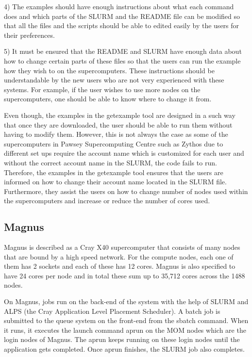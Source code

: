 \documentclass[journal]{IEEEtran}
\begin{document}
4) The examples should have enough instructions about what each command does and which parts of the SLURM and the README file can be modified so that
all the files and the scripts should be able to edited easily by the users for their preferences.

5) It must be ensured that the README and SLURM have enough data about how to change certain parts of these files so that the users can run the 
example how they wish to on the supercomputers. These instructions should be understandable by the new users who are not very experienced with these
systems. For example, if the user wishes to use more nodes on the supercomputers, one should be able to know where to change it from.
 
Even though, the examples in the getexample tool are designed in a such way that once they are downloaded, the user should be able to run them without
having to modify them. However, this is not always the case as some of the supercomputers in Pawsey Supercomputing Centre such as Zythos due to
different set ups require the account name which is customized for each user and without the correct account name in the SLURM, the code fails to run. 
Therefore, the examples in the getexample tool ensures that the users are informed on how to change their account name located in the SLURM file.
Furthermore, they assist the users on how to change number of nodes used within the supercomputers and increase or reduce the number of cores used.     


\subsection{Magnus}

Magnus is described as a Cray X40 supercomputer that consists of many nodes that are bound by a high speed network. For the compute nodes, each one 
of them has 2 sockets and each of these has 12 cores. Magnus is also specified to have 24 cores per node and in total these sum up to 35,712 cores across 
the 1488 nodes. 

On Magnus, jobs run on the back-end of the system with the help of SLURM and ALPS (the Cray Application Level Placement Scheduler). A 
batch job is submitted to the queue system on the front-end from the sbatch command. When it runs, it executes the launch command aprun on the MOM nodes 
which are the login nodes of Magnus. The aprun keeps running on these login nodes until the application gets completed. Once aprun finishes, the SLURM 
job also completes.
\end{document}

